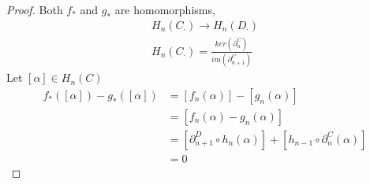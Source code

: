 \documentclass[../notes.tex]{subfiles}
\begin{document}
\begin{proof}
    Both $f_{*}$ and $g_{*}$ are homomorphisms,
    \begin{align*}
        H_n(C_{\cdot})\rightarrow H_n (D_{\cdot}) \\
        H_n(C_{\cdot})=\frac{ker(\partial_n^C)}{im(\partial_{n+1}^C)}
    \end{align*}
    Let $[\alpha]\in H_n(C)$
    \begin{align*}
        f_{*}([\alpha])-g_{*}([\alpha])&=[f_n(\alpha)]-[g_n(\alpha)]\\
        &=[f_n(\alpha)-g_n(\alpha)]\\
        &=[\partial_{n+1}^D\circ h_n(\alpha)]+[h_{n-1}\circ\partial_n^C(\alpha)]\\
        &=0
    \end{align*}
\end{proof}
\end{document}
